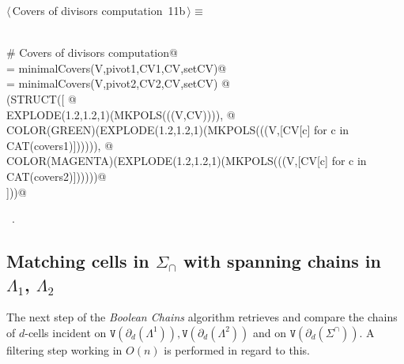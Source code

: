 \documentclass[11pt,oneside]{article}	%
\begin{document}
\begin{flushleft} \small \label{scrap20}
\protect{}$\langle\,$Covers of divisors computation\nobreak\ {\footnotesize 11b}$\,\rangle\equiv$
\vspace{-1ex}
\begin{list}{}{} \item
\mbox{}\verb@@\\
\mbox{}\verb@# Covers of divisors computation@\\
\mbox{} = minimalCovers(V,pivot1,CV1,CV,setCV)@\\
\mbox{} = minimalCovers(V,pivot2,CV2,CV,setCV)  @\\
\mbox{}\verb@VIEW(STRUCT([ @\\
\mbox{}\verb@   EXPLODE(1.2,1.2,1)(MKPOLS(((V,CV)))), @\\
\mbox{}\verb@   COLOR(GREEN)(EXPLODE(1.2,1.2,1)(MKPOLS(((V,[CV[c] for c in CAT(covers1)]))))), @\\
\mbox{}\verb@   COLOR(MAGENTA)(EXPLODE(1.2,1.2,1)(MKPOLS(((V,[CV[c] for c in CAT(covers2)])))))@\\
\mbox{}\verb@    ]))@\\
\mbox{}\verb@@{\NWsep}
\end{list}
\vspace{-1ex}
\footnotesize\addtolength{\baselineskip}{-1ex}
\begin{list}{}{\setlength{\itemsep}{-\parsep}\setlength{\itemindent}{-\leftmargin}}
\item \NWtxtMacroRefIn\ .
\end{list}
\end{flushleft}


\subsection{Matching cells in $\Sigma_\cap$ with spanning chains in $\Lambda_1$, $\Lambda_2$}

The next step of the \emph{Boolean Chains} algorithm retrieves and compare the chains of $d$-cells incident on $\texttt{V}(\partial_d(\Lambda^1)), \texttt{V}(\partial_d(\Lambda^2))$ and on $\texttt{V}(\partial_d(\Sigma^\cap))$. A filtering step working in $O(n)$ is performed in regard to this.
\end{document}
